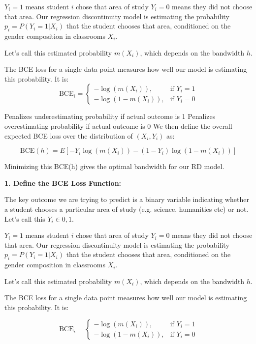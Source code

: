 $Y_i = 1$ means student $i$ chose that area of study
$Y_i = 0$ means they did not choose that area.
Our regression discontinuity model is estimating the probability $p_i = P(Y_i = 1 | X_i)$  that the student chooses that area, conditioned on the gender composition in classrooms $X_i$.

Let's call this estimated probability $m(X_i)$, which depends on the bandwidth $h$.

The BCE loss for a single data point measures how well our model is estimating this probability. It is:
\begin{equation}
    \text{BCE}_i = \begin{cases}
-\log(m(X_i)), & \text{if } Y_i = 1\\
-\log(1 - m(X_i)), & \text{if } Y_i = 0
\end{cases}
\end{equation}
 

Penalizes underestimating probability if actual outcome is 1
Penalizes overestimating probability if actual outcome is 0
We then define the overall expected BCE loss over the distribution of $(X_i, Y_i)$ as:

$$\text{BCE}(h) = E[-Y_i \log(m(X_i)) - (1-Y_i)\log(1-m(X_i))]$$

Minimizing this BCE(h) gives the optimal bandwidth for our RD model.
 

\textbf{ 1. Define the BCE Loss Function:}

The key outcome we are trying to predict is a binary variable indicating whether a student chooses a particular area of study (e.g. science, humanities etc) or not. Let's call this $Y_i \in {0, 1}$.

$Y_i = 1$ means student $i$ chose that area of study
$Y_i = 0$ means they did not choose that area.
Our regression discontinuity model is estimating the probability $p_i = P(Y_i = 1 | X_i)$  that the student chooses that area, conditioned on the gender composition in classrooms $X_i$.

Let's call this estimated probability $m(X_i)$, which depends on the bandwidth $h$.

The BCE loss for a single data point measures how well our model is estimating this probability. It is:

\begin{equation}
    \text{BCE}_i = \begin{cases}
-\log(m(X_i)), & \text{if } Y_i = 1\\
-\log(1 - m(X_i)), & \text{if } Y_i = 0
\end{cases}
\end{equation}

